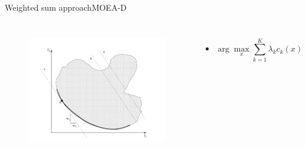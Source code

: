 \begin{frame}{Weighted sum approach}{MOEA-D}
	\begin{columns}
		\begin{figure}
			\centering
			\includegraphics[width=\linewidth]{figure/weighted_sum}
			\label{fig:weighted_sum}
		\end{figure}
		\begin{minipage}{\textwidth}
			\begin{itemize}[leftmargin=*]
				\item \begin{equation}
				\nonumber
				\arg\max_x \sum_{k=1}^{K} \lambda_{k} c_{k} (x)
				\end{equation}
			\end{itemize}
		\end{minipage}
	\end{columns}
\end{frame}

